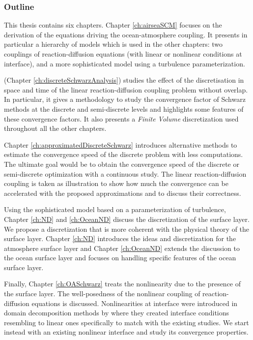 \subsubsection*{Outline}
This thesis contains six chapters.
Chapter \ref{ch:airseaSCM} focuses on the derivation of the equations
driving the ocean-atmosphere coupling. It presents in particular
a hierarchy of models which is used in the other chapters:
two couplings of reaction-diffusion equations (with linear
or nonlinear conditions at interface), and a more sophisticated
model using a turbulence parameterization.
\par
%
\citep{clement_discrete_2022-1} (Chapter
\ref{ch:discreteSchwarzAnalysis}) studies the effect
of the discretisation in space and time of the linear
reaction-diffusion coupling problem without overlap.
In particular, it gives a methodology to study the convergence factor
of Schwarz methods at the discrete and semi-discrete levels
and highlights some features of these convergence factors.
It also presents a \textit{Finite Volume} discretization
used throughout all the other chapters.
\par
%
Chapter \ref{ch:approximatedDiscreteSchwarz}
introduces alternative methods to estimate the convergence
speed of the discrete problem with less computations.
The ultimate goal would be to obtain the convergence speed of
the discrete or semi-discrete optimization with a continuous study.
The linear reaction-diffusion coupling is taken as illustration
to show how much the convergence can be accelerated with the
proposed approximations and to discuss their correctness.
\par
%
Using the sophisticated model based on a parameterization of turbulence,
Chapter \ref{ch:ND} and \ref{ch:OceanND} discuss the discretization of
the surface layer. We propose a discretization that is more coherent
with the physical theory of the surface layer.
Chapter \ref{ch:ND} introduces the ideas
and discretization for the atmosphere surface layer and
Chapter \ref{ch:OceanND} extends the
discussion to the ocean surface layer and focuses on handling
specific features of the ocean surface layer.
%
\par
Finally, Chapter \ref{ch:OASchwarz} treats the nonlinearity due
to the presence of the surface layer.
The well-posedness of the nonlinear coupling of
reaction-diffusion equations is discussed.
Nonlinearities
at interface were introduced in domain decomposition methods by
\citep{caetano_schwarz_2011} where they created interface
conditions resembling to linear ones specifically to match
with the existing studies.
We start instead with an existing nonlinear interface
and study its convergence properties.
